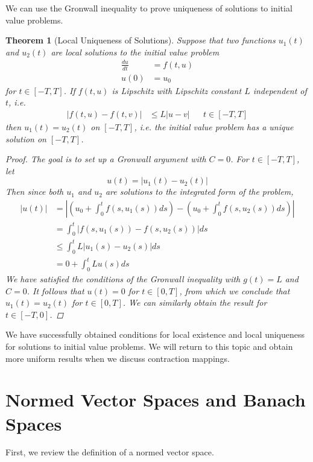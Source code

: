 \documentclass[10pt]{article}         %
\newtheorem{theorem}{Theorem}[section]
\theoremstyle{remark}
\begin{document}
We can use the Gronwall inequality to prove uniqueness of solutions to initial value problems.

\begin{theorem}[Local Uniqueness of Solutions]
Suppose that two functions $u_1(t)$ and $u_2(t)$ are
local solutions to the initial value problem
\begin{align*}
\frac{du}{dt} &= f(t, u) \\
u(0) &= u_0
\end{align*}
for $t \in [-T, T]$. If $f(t, u)$ is Lipschitz with Lipschitz constant $L$ independent of $t$, i.e.
\begin{align*}
|f(t, u) − f(t, v)| &\leq L|u-v| && t \in [-T, T]
\end{align*}
then $u_1(t) = u_2(t)$ on $[-T,T]$, i.e. the initial value problem has a unique solution on $[-T,T]$.
\begin{proof}
The goal is to set up a Gronwall argument with $C = 0$. For $t \in [-T, T]$, let
\[
u(t) = |u_1(t) - u_2(t)|
\]
Then since both $u_1$ and $u_2$ are solutions to the integrated form of the problem, 
\begin{align*}
|u(t)| &= \left| \left( u_0 + \int_0^t f(s, u_1(s))ds \right) - \left( u_0 + \int_0^t f(s, u_2(s))ds \right)  \right| \\
&= \int_0^t | f(s, u_1(s)) - f(s, u_2(s)) | ds \\
&\leq \int_0^t L |u_1(s) - u_2(s)| ds \\
&= 0 + \int_0^t L u(s) ds
\end{align*}
We have satisfied the conditions of the Gronwall inequality with $g(t) = L$ and $C = 0$. It follows that $u(t) = 0$ for $t \in [0, T]$, from which we conclude that $u_1(t) = u_2(t)$ for $t \in [0, T]$. We can similarly obtain the result for $t \in [-T,0]$.
\end{proof}
\end{theorem}

We have successfully obtained conditions for local existence and local uniqueness for solutions to initial value problems. We will return to this topic and obtain more uniform results when we discuss contraction mappings.

\section{Normed Vector Spaces and Banach Spaces}

First, we review the definition of a normed vector space.
\end{document}
